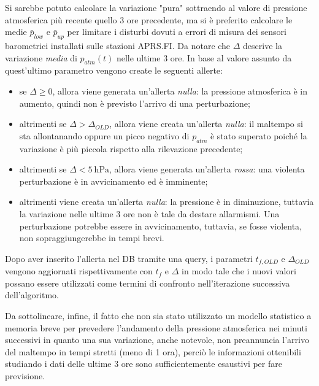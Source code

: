 Si sarebbe potuto calcolare la variazione "pura" sottraendo al valore di pressione atmosferica più recente quello 3 ore precedente, ma si è preferito calcolare le medie $\bar{p}_{low}$ e $\bar{p}_{up}$ per limitare i disturbi dovuti a errori di misura dei sensori barometrici installati sulle stazioni APRS.FI. Da notare che $\Delta$ descrive la variazione \textit{media} di $p_{atm}(t)$ nelle ultime 3 ore. In base al valore assunto da quest'ultimo parametro vengono create le seguenti allerte:
\begin{itemize}
	\item se $\Delta \ge 0$, allora viene generata un'allerta \textit{nulla}: la pressione atmosferica è in aumento, quindi non è previsto l'arrivo di una perturbazione;
	\item altrimenti se $\Delta > \Delta_{OLD}$, allora viene creata un'allerta \textit{nulla}: il maltempo si sta allontanando oppure un picco negativo di $p_{atm}$ è stato superato poiché la variazione è più piccola rispetto alla rilevazione precedente;
	\item altrimenti se $\Delta < \SI{5}{\hecto\pascal}$, allora viene generata un'allerta \textit{rossa}: una violenta perturbazione è in avvicinamento ed è imminente;
	\item altrimenti viene creata un'allerta \textit{nulla}: la pressione è in diminuzione, tuttavia la variazione nelle ultime 3 ore non è tale da destare allarmismi. Una perturbazione potrebbe essere in avvicinamento, tuttavia, se fosse violenta, non sopraggiungerebbe in tempi brevi.
\end{itemize}
Dopo aver inserito l'allerta nel DB tramite una query, i parametri $t_{f,OLD}$ e $\Delta_{OLD}$ vengono aggiornati rispettivamente con $t_f$ e $\Delta$ in modo tale che i nuovi valori possano essere utilizzati come termini di confronto nell'iterazione successiva dell'algoritmo. 
\par Da sottolineare, infine, il fatto che non sia stato utilizzato un modello statistico a memoria breve per prevedere l'andamento della pressione atmosferica nei minuti successivi in quanto una sua variazione, anche notevole, non preannuncia l'arrivo del maltempo in tempi stretti (meno di 1 ora), perciò le informazioni ottenibili studiando i dati delle ultime 3 ore sono sufficientemente esaustivi per fare previsione. 

